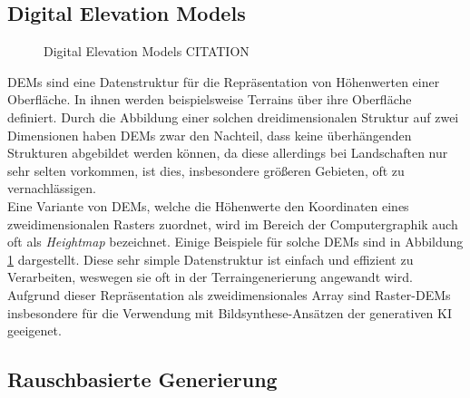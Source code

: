 \subsection{Digital Elevation Models}

\begin{figure}[htbp]
    \centering
    \caption{Digital Elevation Models CITATION}
    \label{fig:DEMs}
\end{figure}
\ac{DEM}s sind eine Datenstruktur für die Repräsentation von Höhenwerten einer Oberfläche. In ihnen werden beispielsweise Terrains über ihre Oberfläche definiert. Durch die Abbildung einer solchen dreidimensionalen Struktur auf zwei Dimensionen haben \ac{DEM}s zwar den Nachteil, dass keine überhängenden Strukturen abgebildet werden können, da diese allerdings bei Landschaften nur sehr selten vorkommen, ist dies, insbesondere größeren Gebieten, oft zu vernachlässigen.\\
Eine Variante von \ac{DEM}s, welche die Höhenwerte den Koordinaten eines zweidimensionalen Rasters zuordnet, wird im Bereich der Computergraphik auch oft als \textit{Heightmap} bezeichnet. Einige Beispiele für solche \ac{DEM}s sind in Abbildung \ref{fig:DEMs} dargestellt. Diese sehr simple Datenstruktur ist einfach und effizient zu Verarbeiten, weswegen sie oft in der Terraingenerierung angewandt wird. Aufgrund dieser Repräsentation als zweidimensionales Array sind Raster-\ac{DEM}s insbesondere für die Verwendung mit Bildsynthese-Ansätzen der generativen \ac{KI} geeigenet.

\subsection{Rauschbasierte Generierung}

